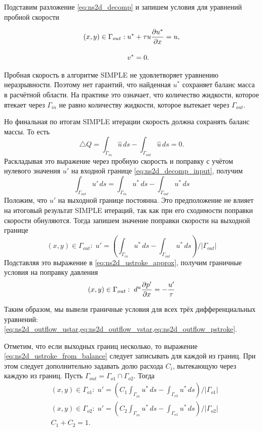 Подставим разложение \cref{eq:ns2d_decomp} и запишем условия для уравнений пробной скорости

\begin{align}
\label{eq:ns2d_outflow_ustar}
(x,y)\in\Gamma_{out}:\; &u^* + \tau u\frac{\partial u^*}{\partial x} = u,\\[10pt]
\label{eq:ns2d_outflow_vstar}
                        &v^* = 0.
\end{align}

Пробная скорость в алгоритме SIMPLE не удовлетворяет уравнению неразрывности.
Поэтому нет гарантий, что найденная $u^*$ сохраняет баланс масса в расчётной области.
На практике это означает, что количество жидкости, которое втекает через $\Gamma_{in}$ не равно
количеству жидкости, которое вытекает через $\Gamma_{out}$.

Но финальная по итогам SIMPLE итерации скорость должна сохранять баланс массы.
То есть
$$
\triangle Q = \int_{\Gamma_{in}} \hat u \, ds - \int_{\Gamma_{out}} \hat u \, ds = 0.
$$
Раскладывая это выражение через пробную скорость и поправку с учётом нулевого значения $u'$ на входной границе \cref{eq:ns2d_decomp_input},
получим
$$
\int_{\Gamma_{out}} u' \, ds = \int_{\Gamma_{in}} u^* \, ds - \int_{\Gamma_{out}} u^* \, ds
$$
Положим, что $u'$ на выходной границе постоянна.
Это предположение не влияет на итоговый результат SIMPLE итераций, так как
при его сходимости поправки скорости обнуляются. Тогда запишем значение поправки скорости
на выходной границе
\begin{equation}
\label{eq:ns2d_ustroke_from_balance}
(x,y)\in\Gamma_{out}:\; u' = \left(\int_{\Gamma_{in}} u^* \, ds - \int_{\Gamma_{out}} u^* \, ds \right) / \left|\Gamma_{out}\right|
\end{equation}
Подставляя это выражение в \cref{eq:ns2d_ustroke_approx}, получим граничные условия на поправку давления
\begin{equation}
\label{eq:ns2d_outflow_pstroke}
(x,y)\in\Gamma_{out}:\;  d^u\frac{\partial p'}{\partial x} = -\frac{u'}{\tau}
\end{equation}

Таким образом, мы вывели граничные условия для всех трёх дифференциальных уравнений:
\cref{eq:ns2d_outflow_ustar,eq:ns2d_outflow_vstar,eq:ns2d_outflow_pstroke}.

Отметим, что если выходных границ несколько, то выражение \cref{eq:ns2d_ustroke_from_balance}
следует записывать для каждой из границ. При этом следует дополнительно задавать
долю расхода $C_i$, вытекающую через каждую из границ. Пусть $\Gamma_{out} = \Gamma_{o1} \cap \Gamma_{o2}$.
Тогда
\begin{align*}
&(x,y)\in\Gamma_{o1}:\; u' = \left(C_1 \int_{\Gamma_{in}} u^* \, ds - \int_{\Gamma_{o2}} u^* \, ds \right) / \left|\Gamma_{o1}\right|\\
&(x,y)\in\Gamma_{o2}:\; u' = \left(C_2 \int_{\Gamma_{in}} u^* \, ds - \int_{\Gamma_{o1}} u^* \, ds \right) / \left|\Gamma_{o2}\right|\\
&C_1 + C_2 = 1.
\end{align*}

